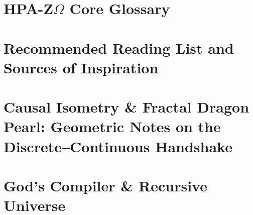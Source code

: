 \documentclass[11pt,a4paper,twoside]{book}
\begin{document}
\chapter{\texorpdfstring{HPA-Z$\Omega$}{HPA-ZΩ} Core Glossary}


\chapter{Recommended Reading List and Sources of Inspiration}


\chapter{Causal Isometry \& Fractal Dragon Pearl: Geometric Notes on the Discrete--Continuous Handshake}


\chapter{God's Compiler \& Recursive Universe}

\end{document}
